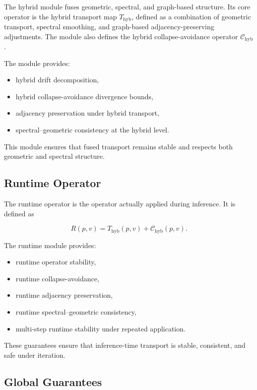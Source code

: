 \documentclass[11pt]{article}
\begin{document}
The hybrid module fuses geometric, spectral, and graph-based structure.
Its core operator is the hybrid transport map $T_{\mathrm{hyb}}$, defined
as a combination of geometric transport, spectral smoothing, and
graph-based adjacency-preserving adjustments. The module also defines the
hybrid collapse-avoidance operator $\mathcal{C}_{\mathrm{hyb}}$.

The module provides:

\begin{itemize}
    \item hybrid drift decomposition,
    \item hybrid collapse-avoidance divergence bounds,
    \item adjacency preservation under hybrid transport,
    \item spectral--geometric consistency at the hybrid level.
\end{itemize}

This module ensures that fused transport remains stable and respects both
geometric and spectral structure.

\subsection{Runtime Operator}

The runtime operator is the operator actually applied during inference.
It is defined as

\[
R(p,v)
=
T_{\mathrm{hyb}}(p,v)
+
\mathcal{C}_{\mathrm{hyb}}(p,v).
\]

The runtime module provides:

\begin{itemize}
    \item runtime operator stability,
    \item runtime collapse-avoidance,
    \item runtime adjacency preservation,
    \item runtime spectral--geometric consistency,
    \item multi-step runtime stability under repeated application.
\end{itemize}

These guarantees ensure that inference-time transport is stable,
consistent, and safe under iteration.

\subsection{Global Guarantees}
\end{document}
